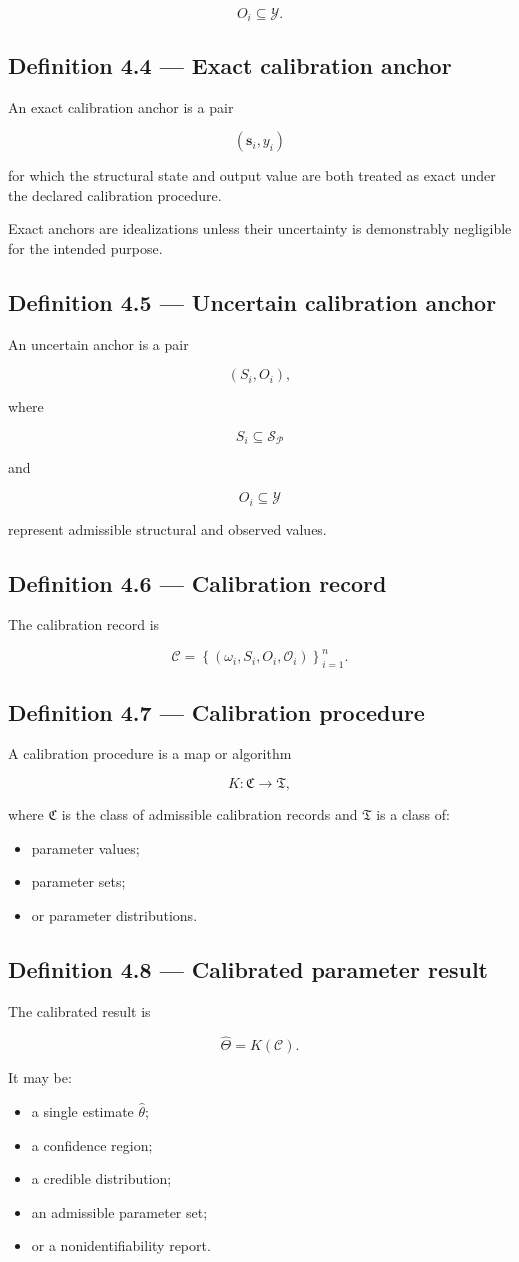 \documentclass[11pt,oneside,openany]{book}
\newcommand{\PCsubsection}[1]{%
  \subsection*{#1}%
}
\begin{document}
\[
O_i\subseteq\mathcal Y.
\]

\PCsubsection{Definition 4.4 --- Exact calibration anchor}

An exact calibration anchor is a pair

\[
\boxed{ (\mathbf s_i,y_i) }
\]

for which the structural state and output value are both treated as exact under the declared calibration procedure.

Exact anchors are idealizations unless their uncertainty is demonstrably negligible for the intended purpose.

\PCsubsection{Definition 4.5 --- Uncertain calibration anchor}

An uncertain anchor is a pair

\[
\boxed{ (S_i,O_i), }
\]

where

\[
S_i\subseteq\mathcal S_{\mathcal P}
\]

and

\[
O_i\subseteq\mathcal Y
\]

represent admissible structural and observed values.

\PCsubsection{Definition 4.6 --- Calibration record}

The calibration record is

\[
\boxed{ \mathcal C = \left\{ (\omega_i,S_i,O_i,\mathcal O_i) \right\}_{i=1}^{n}. }
\]

\PCsubsection{Definition 4.7 --- Calibration procedure}

A calibration procedure is a map or algorithm

\[
\boxed{ K: \mathfrak C\to\mathfrak T, }
\]

where \(\mathfrak C\) is the class of admissible calibration records and \(\mathfrak T\) is a class of:

\begin{itemize}
\item parameter values;
\item parameter sets;
\item or parameter distributions.
\end{itemize}
\PCsubsection{Definition 4.8 --- Calibrated parameter result}

The calibrated result is

\[
\boxed{ \widehat\Theta = K(\mathcal C). }
\]

It may be:

\begin{itemize}
\item a single estimate \(\widehat\theta\);
\item a confidence region;
\item a credible distribution;
\item an admissible parameter set;
\item or a nonidentifiability report.
\end{itemize}
\end{document}
